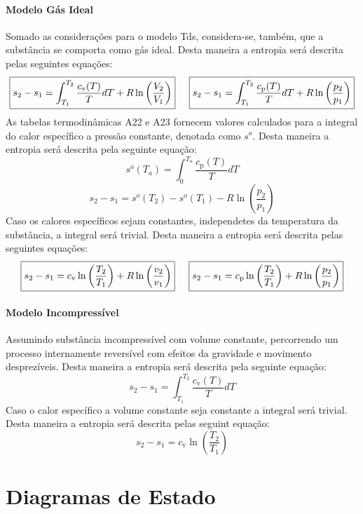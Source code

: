 \documentclass{article}
\begin{document}
            \paragraph{Modelo Gás Ideal}Somado as considerações para o modelo Tds, considera-se, também, que a substância se comporta como gás ideal. Desta maneira a entropia será descrita pelas seguintes equações:
                \[
                    \boxed{s_{2} - s_{1} = \int_{T_{1}}^{T_{2}} \frac{c_{\text{v}}(T)}{T}dT + R \ln\left(\frac{V_{2}}{V_{1}}\right)} \hspace{5mm}
                    \boxed{s_{2} - s_{1} = \int_{T_{1}}^{T_{2}} \frac{c_{\text{p}}(T)}{T}dT + R \ln\left(\frac{p_{2}}{p_{1}}\right)}
                \]
            As tabelas termodinâmicas A22 e A23 fornecem valores calculados para a integral do calor específico a pressão constante, denotada como $s^{o}$. Desta maneira a entropia será descrita pela seguinte equação:
                \[s^{o}(T_{a}) = \int_{0}^{T_{a}} \frac{c_{\text{p}}(T)}{T}dT\]
                \[\boxed{s_{2} - s_{1} = s^{o}(T_{2}) - s^{o}(T_{1}) - R \ln\left(\frac{p_{2}}{p_{1}}\right)}\]
            Caso os calores específicos sejam constantes, independetes da temperatura da substância, a integral será trivial. Desta maneira a entropia será descrita pelas seguintes equações:
                \[
                    \boxed{s_{2} - s_{1} = c_{\text{v}} \ln\left(\frac{T_{2}}{T_{1}}\right) + R \ln\left(\frac{v_{2}}{v_{1}}\right)} \hspace{5mm}
                    \boxed{s_{2} - s_{1} = c_{\text{p}} \ln\left(\frac{T_{2}}{T_{1}}\right) + R \ln\left(\frac{p_{2}}{p_{1}}\right)}
                \]

            \paragraph{Modelo Incompressível}Assumindo substância incompressível com volume constante, percorrendo um processo internamente reversível com efeitos da gravidade e movimento desprezíveis. Desta maneira a entropia será descrita pela seguinte equação:
                \[\boxed{s_{2} - s_{1} = \int_{T_{1}}^{T_{2}} \frac{c_{\text{v}}(T)}{T} dT}\]
            Caso o calor específico a volume constante seja constante a integral será trivial. Desta maneira a entropia será descrita pelas seguint equação:
                \[\boxed{s_{2} - s_{1} = c_{\text{v}} \ln\left(\frac{T_{2}}{T_{1}}\right)}\]
\newpage

    \section{Diagramas de Estado}
\end{document}
